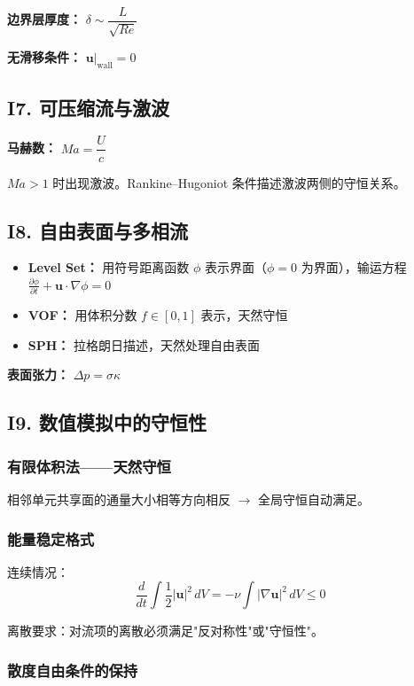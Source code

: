 \textbf{边界层厚度：} $\delta \sim \dfrac{L}{\sqrt{Re}}$

\textbf{无滑移条件：} $\mathbf{u}|_{\text{wall}} = 0$

\subsection{I7. 可压缩流与激波}

\textbf{马赫数：} $Ma = \dfrac{U}{c}$

$Ma > 1$ 时出现激波。Rankine--Hugoniot 条件描述激波两侧的守恒关系。

\subsection{I8. 自由表面与多相流}

\begin{itemize}
  \item \textbf{Level Set：} 用符号距离函数 $\phi$ 表示界面（$\phi = 0$ 为界面），输运方程 $\frac{\partial \phi}{\partial t} + \mathbf{u}\cdot\nabla\phi = 0$
  \item \textbf{VOF：} 用体积分数 $f \in [0,1]$ 表示，天然守恒
  \item \textbf{SPH：} 拉格朗日描述，天然处理自由表面
\end{itemize}

\textbf{表面张力：} $\Delta p = \sigma \kappa$

\subsection{I9. 数值模拟中的守恒性}

\subsubsection{有限体积法——天然守恒}

相邻单元共享面的通量大小相等方向相反 $\to$ 全局守恒自动满足。

\subsubsection{能量稳定格式}

连续情况：
\[
\frac{d}{dt}\int \frac{1}{2}|\mathbf{u}|^2\,dV = -\nu\int|\nabla\mathbf{u}|^2\,dV \leq 0
\]

离散要求：对流项的离散必须满足"反对称性"或"守恒性"。

\subsubsection{散度自由条件的保持}

